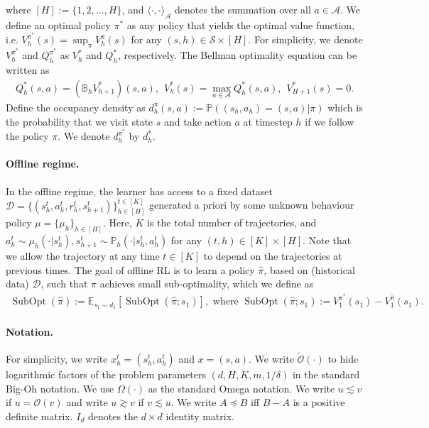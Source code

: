 \documentclass{article} \usepackage{iclr2023/iclr2023_conference,times}
\DeclareMathOperator*{\subopt}{SubOpt}
\begin{document}
where $[H] := \{1, 2, \ldots, H\}$, and $\langle \cdot, \cdot \rangle_{\mathcal{A}}$ denotes the summation over all $a \in \mathcal{A}$. 
We define an optimal policy $\pi^*$ as any policy that yields the optimal value function, i.e. $V^{\pi^*}_h(s) = \sup_{\pi} V_h^{\pi}(s)$ for any $(s,h) \in \mathcal{S} \times [H]$. For simplicity, we denote $V^{\pi^*}_h$ and $Q^{\pi^*}_h$ as $V^*_h$ and $Q^*_h$, respectively. The Bellman optimality equation can be written as
\begin{align*}
    Q^*_h(s,a) = (\mathbb{B}_h V^*_{h+1})(s,a), \hspace{5pt} V^*_h(s) = \max_{a \in \mathcal{A}} Q^*_h(s,a), \hspace{5pt} V^*_{H+1}(s) = 0.
\end{align*}
Define the occupancy density as  $d^{\pi}_h(s,a) := \mathbb{P}((s_h,a_h) = (s,a) | \pi)$ which is the probability that we visit state $s$ and take action $a$ at timestep $h$ if we follow the policy $\pi.$  
We denote $d^{\pi^*}_h$ by $d^*_h$. 

\paragraph{Offline regime.} In the offline regime, the learner has access to a fixed dataset $\mathcal{D} = \{(s^t_h, a^t_h, r^t_h, s^t_{h+1})\}^{t \in [K]}_{h \in [H]}$ generated a priori by some unknown behaviour policy $\mu = \{\mu_h\}_{h \in [H]}$. Here, $K$ is the total number of trajectories, and $a^t_h \sim \mu_h(\cdot|s^t_h), s^t_{h+1} \sim \mathbb{P}_h(\cdot| s^t_h, a^t_h)$ for any $(t,h) \in [K] \times [H]$. Note that we allow the trajectory at any time $t \in [K]$ to depend on the trajectories at previous times. The goal of offline RL is to learn a policy $\hat{\pi}$, based on (historical data) $\mathcal{D}$,
such that $\hat{\pi}$ achieves small sub-optimality, which we define as
\begin{align*}
    \subopt( \hat{\pi} ) := \mathbb{E}_{s_1 \sim d_1} \left[ \subopt(\hat{\pi}; s_1) \right], \text{ where }
    \subopt(\hat{\pi}; s_1) := V^{\pi^*}_1(s_1) - V^{\hat{\pi}}_1(s_1).
\end{align*}



\paragraph{Notation.} For simplicity, we write $x^t_h = (s^t_h, a^t_h)$ and $x = (s,a)$. We write $\tilde{\mathcal{O}}(\cdot)$ to hide logarithmic factors of the problem parameters $(d,H,K,m, 1/\delta)$ in the standard Big-Oh notation. We use $\Omega(\cdot)$ as the standard Omega notation. We write $u \lesssim v$ if $u = {\mathcal{O}}(v)$ and write $u \gtrsim v$ if $v \lesssim u$. We write $A \preceq B$ iff $B - A$ is a positive definite matrix. $I_d$  denotes the $d \times d$ identity matrix. 
\end{document}
